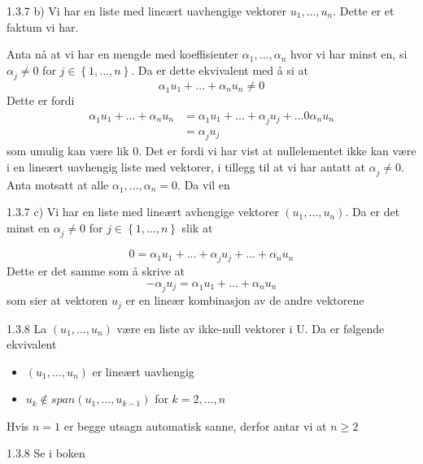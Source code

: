 \documentclass[a4paper,norsk]{article}
\renewcommand{\geq}{\geqslant}
\begin{document}
\begin{proofbox}{1.3.7 b)}{}
Vi har en liste med lineært uavhengige vektorer $ u_1, ..., u_n $. Dette er et faktum vi har. 

Anta nå at vi har en mengde med koeffisienter $ \alpha_{1}^{}, ..., \alpha_{n}^{} $ hvor vi har minst en, si $ \alpha_{j}^{} \neq 0 $  for $ j \in \left\{ 1, ..., n \right\}  $. Da er dette ekvivalent med å si at 
\[
    \alpha_{1}^{} u_1 + ... + \alpha_{n}^{} u_n \neq 0
\]
Dette er fordi 
\begin{align*}
    \alpha_{1}^{} u_1 + ... + \alpha_{n}^{} u_n &= \alpha_{1}^{} u_1 + ... + \alpha_{j}^{} u_j + ... 0 \alpha_{n}^{} u_n \\
    &= \alpha_{j}^{} u_j
\end{align*}
som umulig kan være lik 0. Det er fordi vi har vist at nullelementet ikke kan være i en lineært uavhengig liste med vektorer, i tillegg til at vi har antatt at $ \alpha_{j}^{} \neq 0 $.\\

Anta motsatt at alle $ \alpha_{1}^{} , ..., \alpha_{n}^{} = 0 $. Da vil en  
\end{proofbox}

\begin{proofbox}{1.3.7 c)}{}
Vi har en liste med lineært avhengige vektorer $ \left( u_1, ..., u_n \right)  $. Da er det minst en $ \alpha_{j}^{} \neq 0 $ for $ j \in \left\{ 1, ..., n \right\}  $ slik at 

\[
    0 = \alpha_{1}^{} u_1 + ...+ \alpha_{j}^{} u_j + ...+ \alpha_{n}^{} u_n
\]
Dette er det samme som å skrive at 
\[
    - \alpha_{j}^{} u_j = \alpha_{1}^{} u_1 + ... + \alpha_{n}^{} u_n
\]
som sier at vektoren $ u_j $ er en lineær kombinasjon av de andre vektorene 
\end{proofbox}

\begin{lemmabox}{1.3.8}{}
La $ \left( u_1, ..., u_n \right)  $ være en liste av ikke-null vektorer i U. Da er følgende ekvivalent
\begin{itemize}
    \item $ \left( u_1, ..., u_n \right)  $ er lineært uavhengig
    \item $ u_k \notin span \left( u_1, ..., u_{k-1} \right)  $ for $ k=2, ..., n $ 
\end{itemize}
Hvis $ n=1 $ er begge utsagn automatisk sanne, derfor antar vi at $ n \geq 2 $ 
\end{lemmabox}

\begin{proofbox}{1.3.8}{}
Se i boken
\end{proofbox}
\end{document}
